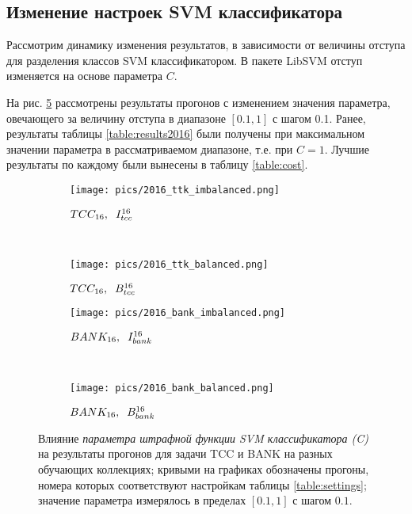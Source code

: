 \subsection{Изменение настроек SVM классификатора}
Рассмотрим динамику изменения результатов, в зависимости от величины
отступа для разделения классов SVM классификатором.
В пакете LibSVM отступ изменяется на основе параметра $C$.

На рис. \ref{fig:cost} рассмотрены результаты прогонов с
изменением значения параметра, овечающего за величину отступа в диапазоне
$[0.1, 1]$ с шагом 0.1. Ранее, результаты таблицы \ref{table:results2016}
были получены при максимальном значении параметра в рассматриваемом диапазоне,
т.е. при $C= 1$.
Лучшие результаты по каждому были вынесены в таблицу \ref{table:cost}.

\begin{figure}[!htop] \centering
    \begin{subfigure}[b]{0.32\textwidth}
        \texttt{[image: pics/2016\_ttk\_imbalanced.png]}
        \caption{$TCC_{16}, \hspace{0.2cm} I_{tcc}^{16}$}
        \label{fig:cost_ttk_2016_imb}
    \end{subfigure}
    ~
    \begin{subfigure}[b]{0.32\textwidth}
        \texttt{[image: pics/2016\_ttk\_balanced.png]}
        \caption{$TCC_{16}, \hspace{0.2cm} B_{tcc}^{16}$}
        \label{fig:cost_ttk_2016_b}
    \end{subfigure}

    \begin{subfigure}[b]{0.32\textwidth}
        \texttt{[image: pics/2016\_bank\_imbalanced.png]}
        \caption{$BANK_{16},\hspace{0.2cm} I_{bank}^{16}$}
        \label{fig:cost_bank_2016_imb}
    \end{subfigure}
    ~
    \begin{subfigure}[b]{0.32\textwidth}
        \texttt{[image: pics/2016\_bank\_balanced.png]}
        \caption{$BANK_{16},\hspace{0.2cm} B_{bank}^{16}$}
        \label{fig:cost_bank_2016_b}
    \end{subfigure}

    \caption{
        Влияние {\it параметра штрафной функции SVM классификатора (C)}
        на результаты прогонов для задачи TCC и BANK на разных обучающих
        коллекциях;
        кривыми на графиках обозначены прогоны, номера которых соответствуют
        настройкам таблицы \ref{table:settings};
        значение параметра измерялось в пределах $[0.1, 1]$ с шагом $0.1$.
    }
    \label{fig:cost}
\end{figure}


